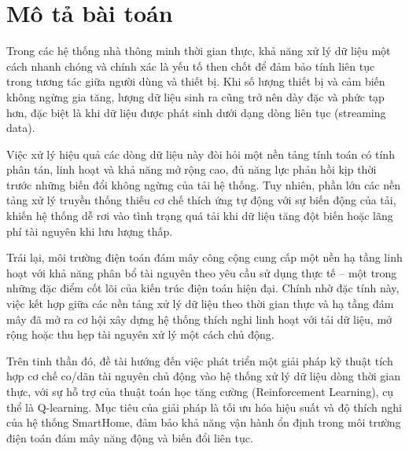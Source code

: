 \section{Mô tả bài toán}

Trong các hệ thống nhà thông minh thời gian thực, khả năng xử lý dữ liệu một cách nhanh chóng và chính xác là yếu tố then chốt để đảm bảo tính liên tục trong tương tác giữa người dùng và thiết bị. Khi số lượng thiết bị và cảm biến không ngừng gia tăng, lượng dữ liệu sinh ra cũng trở nên dày đặc và phức tạp hơn, đặc biệt là khi dữ liệu được phát sinh dưới dạng dòng liên tục (streaming data).

Việc xử lý hiệu quả các dòng dữ liệu này đòi hỏi một nền tảng tính toán có tính phân tán, linh hoạt và khả năng mở rộng cao, đủ năng lực phản hồi kịp thời trước những biến đổi không ngừng của tải hệ thống. Tuy nhiên, phần lớn các nền tảng xử lý truyền thống thiếu cơ chế thích ứng tự động với sự biến động của tải, khiến hệ thống dễ rơi vào tình trạng quá tải khi dữ liệu tăng đột biến hoặc lãng phí tài nguyên khi lưu lượng thấp.

Trái lại, môi trường điện toán đám mây công cộng cung cấp một nền hạ tầng linh hoạt với khả năng phân bổ tài nguyên theo yêu cầu sử dụng thực tế – một trong những đặc điểm cốt lõi của kiến trúc điện toán hiện đại. Chính nhờ đặc tính này, việc kết hợp giữa các nền tảng xử lý dữ liệu theo thời gian thực và hạ tầng đám mây đã mở ra cơ hội xây dựng hệ thống thích nghi linh hoạt với tải dữ liệu, mở rộng hoặc thu hẹp tài nguyên xử lý một cách chủ động.

Trên tinh thần đó, đề tài hướng đến việc phát triển một giải pháp kỹ thuật tích hợp cơ chế co/dãn tài nguyên chủ động vào hệ thống xử lý dữ liệu dòng thời gian thực, với sự hỗ trợ của thuật toán học tăng cường (Reinforcement Learning), cụ thể là Q-learning. Mục tiêu của giải pháp là tối ưu hóa hiệu suất và độ thích nghi của hệ thống SmartHome, đảm bảo khả năng vận hành ổn định trong môi trường điện toán đám mây năng động và biến đổi liên tục.



